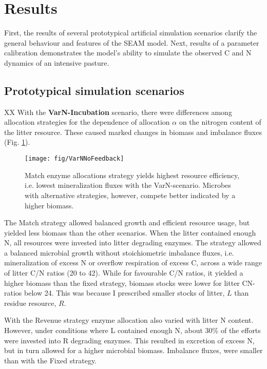 \section{Results}

First, the results of several prototypical artificial simulation scenarios
clarify the general behaviour and features of the SEAM model. Next, results of a
parameter calibration demonstrates the model's ability to
simulate the observed C and N dynamics of an intensive pasture.

\subsection{Prototypical simulation scenarios
\label{sec:ResultsProto}}

XX
With the \textbf{VarN-Incubation} scenario, there were differences among
allocation strategies for the dependence of allocation $\alpha$ on the nitrogen
content of the litter resource. These caused marked changes in
biomass and imbalance fluxes (Fig.
\ref{fig:VarNNoFeedback}).
 
\begin{figure}[t]
\vspace*{2mm}
\begin{center}
\texttt{[image: fig/VarNNoFeedback]}
\end{center}
\caption{Match enzyme allocations strategy yields highest resource
efficiency, i.e. lowest mineralization fluxes with the VarN-scenario. Microbes
with alternative strategies, however, compete better indicated by a higher biomass.
\label{fig:VarNNoFeedback}}
\end{figure}

The Match strategy allowed balanced growth and efficient resource usage, but
yielded less biomass than the other scenarios. When the litter contained enough
N, all resources were invested into litter degrading enzymes. The strategy
allowed a balanced microbial growth without stoichiometric imbalance fluxes,
i.e. mineralization of excess N or overflow respiration of excess C, across a
wide range of litter C/N ratios (20 to 42). While for favourable C/N ratios, it
yielded a higher biomass than the fixed strategy, biomass stocks were lower for
litter CN-ratios below 24. This was because I prescribed smaller stocks of
litter, $L$ than residue resource, $R$. 

With the Revenue strategy enzyme allocation also varied with litter N content.
However, under conditions where L contained enough N, about 30\% of the efforts
were invested into R degrading enzymes. This resulted in excretion of
excess N, but in turn allowed for a higher microbial biomass. Imbalance fluxes,
were smaller than with the Fixed strategy.

